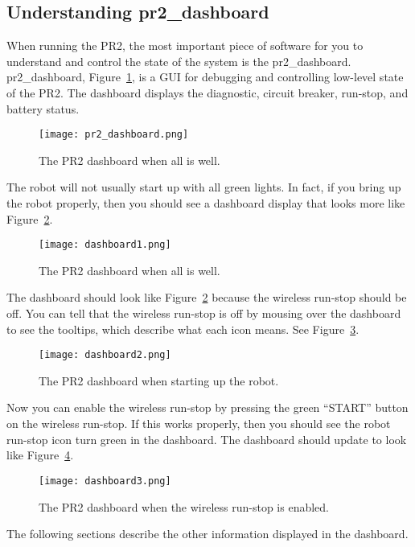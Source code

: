 \subsection{Understanding pr2\_dashboard}
When running the PR2, the most important piece of software for you to understand and control the state of the system is 
the pr2\_dashboard. pr2\_dashboard, Figure~\ref{fig:dashboard}, is a GUI for debugging and controlling low-level state 
of the PR2. The dashboard displays the diagnostic, circuit breaker, run-stop, and battery status.
\begin{figure}[h]
\centering
\texttt{[image: pr2\_dashboard.png]}
\caption{The PR2 dashboard when all is well.}
\label{fig:dashboard}
\end{figure}
The robot will not usually start up with all green lights. In fact, if you bring up the robot properly, then you should see a dashboard display that looks more like Figure~\ref{fig:dashboard1}.
\begin{figure}[h]
\centering
\texttt{[image: dashboard1.png]}
\caption{The PR2 dashboard when all is well.}
\label{fig:dashboard1}
\end{figure}
The dashboard should look like Figure~\ref{fig:dashboard1} because the wireless run-stop should be off. You can tell that the wireless run-stop is off by mousing over the dashboard to see the tooltips, which describe what each icon means. See Figure~\ref{fig:dashboard2}.

\begin{figure}[h]
\centering
\texttt{[image: dashboard2.png]}
\caption{The PR2 dashboard when starting up the robot.}
\label{fig:dashboard2}
\end{figure}

Now you can enable the wireless run-stop by pressing the green ``START'' button on the wireless run-stop. If this works properly, then you should see the robot run-stop icon turn green in the dashboard. The dashboard should update to look like Figure~\ref{fig:dashboard3}.

\begin{figure}[h]
\centering
\texttt{[image: dashboard3.png]}
\caption{The PR2 dashboard when the wireless run-stop is enabled.}
\label{fig:dashboard3}
\end{figure}

The following sections describe the other information displayed in the dashboard.

